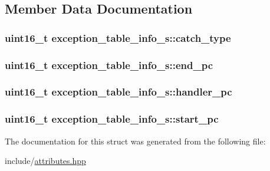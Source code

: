 \subsection{Member Data Documentation}
\hypertarget{structexception__table__info__s_a797170f960fb0a1797a69bca7a1567d0}{
\subsubsection[{catch\+\_\+type}]{\setlength{\rightskip}{0pt plus 5cm}uint16\+\_\+t exception\+\_\+table\+\_\+info\+\_\+s\+::catch\+\_\+type}}\label{structexception__table__info__s_a797170f960fb0a1797a69bca7a1567d0}
\hypertarget{structexception__table__info__s_ab7f40660c6dfb31d0d33443f8631a86b}{
\subsubsection[{end\+\_\+pc}]{\setlength{\rightskip}{0pt plus 5cm}uint16\+\_\+t exception\+\_\+table\+\_\+info\+\_\+s\+::end\+\_\+pc}}\label{structexception__table__info__s_ab7f40660c6dfb31d0d33443f8631a86b}
\hypertarget{structexception__table__info__s_afce7361ca9bc44352ab13a94890d7644}{
\subsubsection[{handler\+\_\+pc}]{\setlength{\rightskip}{0pt plus 5cm}uint16\+\_\+t exception\+\_\+table\+\_\+info\+\_\+s\+::handler\+\_\+pc}}\label{structexception__table__info__s_afce7361ca9bc44352ab13a94890d7644}
\hypertarget{structexception__table__info__s_ae92c43a2d7c711e34fda9bc778e7019c}{
\subsubsection[{start\+\_\+pc}]{\setlength{\rightskip}{0pt plus 5cm}uint16\+\_\+t exception\+\_\+table\+\_\+info\+\_\+s\+::start\+\_\+pc}}\label{structexception__table__info__s_ae92c43a2d7c711e34fda9bc778e7019c}


The documentation for this struct was generated from the following file\+:\begin{DoxyCompactItemize}
\item 
include/\hyperlink{attributes_8hpp}{attributes.\+hpp}\end{DoxyCompactItemize}
